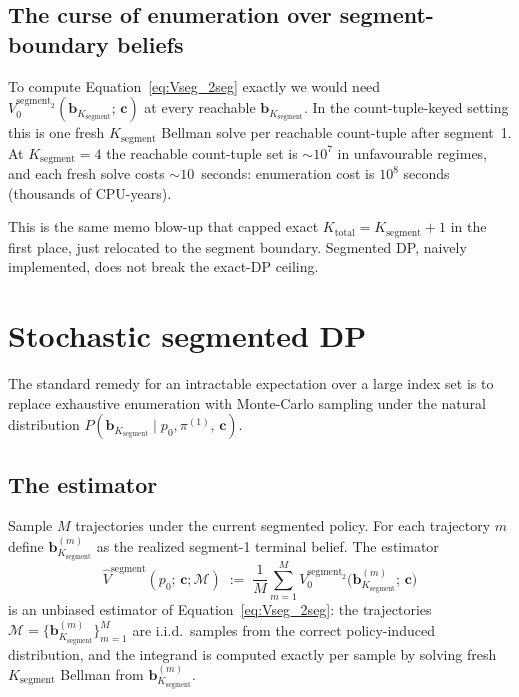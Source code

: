 \documentclass[11pt,a4paper]{article}
\newcommand{\bc}{\bm{c}}
\newcommand{\bb}{\bm{b}}
\begin{document}
\subsection{The curse of enumeration over segment-boundary beliefs}

To compute Equation~\eqref{eq:Vseg_2seg} exactly we would need
$V_0^{\mathrm{segment}_2}(\bb_{K_\mathrm{segment}};\, \bc)$ at every reachable
$\bb_{K_\mathrm{segment}}$.  In the count-tuple-keyed setting this is one fresh
$K_\mathrm{segment}$ Bellman solve per reachable count-tuple after segment~1.  At
$K_\mathrm{segment} = 4$ the reachable count-tuple set is $\sim 10^7$ in unfavourable
regimes, and each fresh solve costs $\sim 10$~seconds: enumeration cost is $10^8$ seconds
(thousands of CPU-years).

This is the same memo blow-up that capped exact $K_\mathrm{total} = K_\mathrm{segment} + 1$
in the first place, just relocated to the segment boundary.  Segmented DP, naively
implemented, does not break the exact-DP ceiling.

\section{Stochastic segmented DP}
\label{sec:stochastic}

The standard remedy for an intractable expectation over a large index set is to replace
exhaustive enumeration with Monte-Carlo sampling under the natural distribution
$P(\bb_{K_\mathrm{segment}} \mid p_0, \pi^{(1)},\, \bc)$.

\subsection{The estimator}

Sample $M$ trajectories under the current segmented policy.  For each trajectory $m$ define
$\bb_{K_\mathrm{segment}}^{(m)}$ as the realized segment-1 terminal belief.  The estimator
\begin{equation}
\widehat{V}^\mathrm{segment}(p_0;\, \bc; \mathcal{M})
\;:=\;
\frac{1}{M} \sum_{m=1}^{M}
V_0^{\mathrm{segment}_2}\bigl(\bb_{K_\mathrm{segment}}^{(m)};\, \bc\bigr)
\label{eq:estimator}
\end{equation}
is an unbiased estimator of Equation~\eqref{eq:Vseg_2seg}: the trajectories
$\mathcal{M} = \{\bb_{K_\mathrm{segment}}^{(m)}\}_{m=1}^M$ are i.i.d.\ samples from the
correct policy-induced distribution, and the integrand is computed exactly per sample by
solving fresh $K_\mathrm{segment}$ Bellman from $\bb_{K_\mathrm{segment}}^{(m)}$.
\end{document}
